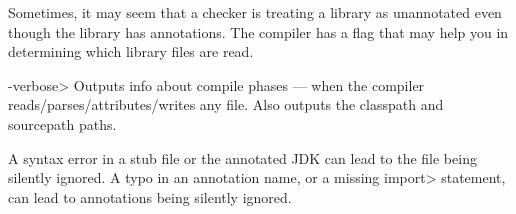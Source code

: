 
Sometimes, it may seem that a checker is treating a library as unannotated
even though the library has annotations.  The compiler has a flag that
may help you in determining which library files are read.

\begin{description}
\item \<-verbose>
  Outputs info about compile phases --- when the compiler
  reads/parses/attributes/writes any file.  Also outputs the classpath and
  sourcepath paths.
\end{description}

A syntax error in a stub file or the annotated JDK can lead to the file
being silently ignored.  A typo in an annotation name, or a missing
\<import> statement, can lead to annotations being silently ignored.


